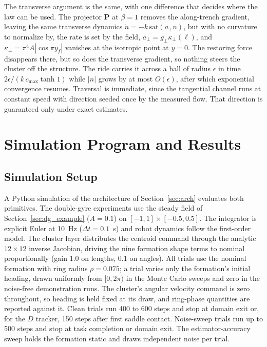 \documentclass[lettersize,journal]{IEEEtran}
\begin{document}
The transverse argument is the same, with one difference that decides
where the law can be used. The projector $\mathbf{P}$ at $\beta = 1$
removes the along-trench gradient, leaving the same transverse dynamics
$\dot{n} = -k\,\mathrm{sat}(a_\perp n)$, but with no curvature to
normalize by, the rate is set by the field, $a_\perp = g_\perp
\kappa_\perp(\ell)$, and $\kappa_\perp = \pi^4 A|\cos \pi y_f|$ vanishes
at the isotropic point at $y = 0$. The restoring force disappears there, but so does the transverse gradient, so nothing steers the cluster off the structure. The ride carries it across a ball of radius $\epsilon$ in time $2\epsilon/(k\,c_{\max}\tanh 1)$ while $|n|$ grows by at most $O(\epsilon)$, after which exponential convergence resumes. Traversal is immediate, since the tangential channel runs at constant speed with direction seeded once by the measured flow. That direction is guaranteed only under exact estimates.

\section{Simulation Program and Results}

\subsection{Simulation Setup}

A Python simulation of the architecture of Section~\ref{sec:arch} evaluates both primitives.
The double-gyre experiments use the steady field of
Section~\ref{sec:dg_example} ($A = 0.1$) on $[-1, 1] \times
[-0.5, 0.5]$. The integrator is explicit Euler at 10~Hz ($\Delta t = 0.1$~s) and robot dynamics follow the first-order model. The cluster layer distributes the centroid command through the analytic $12 \times 12$ inverse Jacobian, driving the nine formation shape terms to nominal proportionally (gain 1.0 on lengths, 0.1 on angles). All trials use the nominal
formation with ring radius $\rho = 0.075$; a trial varies only the
formation's initial heading, drawn uniformly from $[0, 2\pi)$ in the
Monte Carlo sweeps and zero in the noise-free demonstration runs. The
cluster's angular velocity command is zero throughout, so
heading is held fixed at its draw, and ring-phase quantities are reported against it. Clean trials
run 400 to 600 steps and stop at domain exit or, for the $D$ tracker,
150 steps after first saddle contact. Noise-sweep trials run up to 500
steps and stop at task completion or domain exit. The
estimator-accuracy sweep holds the formation static and draws
independent noise per trial.
\end{document}
